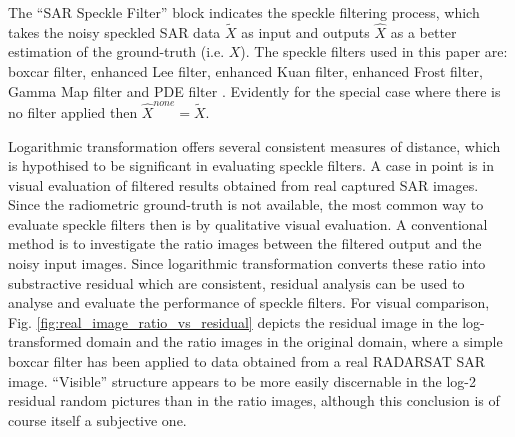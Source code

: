 The ``SAR Speckle Filter'' block indicates the speckle filtering process, 
	which takes the noisy speckled SAR data $\tilde{X}$ as input
	and outputs $\hat{X}$ as a better estimation of the ground-truth (i.e. $X$).
The speckle filters used in this paper are: 
	boxcar filter, enhanced Lee filter, enhanced Kuan filter, enhanced Frost filter, Gamma Map filter 
	and PDE filter \cite{You_TIP_2000}.
Evidently for the special case where there is no filter applied then $\hat{X}^{none} = \tilde{X}$.

Logarithmic transformation offers several consistent measures of distance, which is hypothised to be 
significant in evaluating speckle filters.
	A case in point is in visual evaluation of filtered results obtained from real captured SAR images.
Since the radiometric ground-truth is not available, %
	the most common way to evaluate speckle filters then is by qualitative visual evaluation.
A conventional method is to investigate the ratio images between the filtered output and the noisy input images.
Since logarithmic transformation converts these ratio into substractive residual which are consistent, residual 
analysis can be used to analyse and evaluate the performance of speckle filters.
For visual comparison, Fig. \ref{fig:real_image_ratio_vs_residual} depicts the residual image in the log-transformed domain 
and the ratio images in the original domain, where a simple boxcar filter has been applied to data obtained from a 
real RADARSAT SAR image.
``Visible'' structure appears to be more easily discernable in the log-2 residual random pictures than in 
the ratio images, although this conclusion is of course itself a subjective one.


